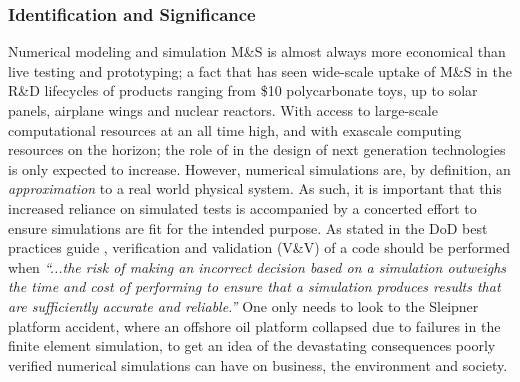 \subsubsection{Identification and Significance}
\label{intro}
Numerical modeling and simulation M\&S is almost always more economical than live testing and prototyping; a fact that has seen wide-scale uptake of M\&S in the R\&D lifecycles of products ranging from \$10 polycarbonate toys, up to solar panels, airplane wings and nuclear reactors. With access to large-scale computational resources at an all time high, and with exascale computing resources on the horizon; the role of \MS in the design of next generation technologies is only expected to increase. However, numerical simulations are, by definition, an \emph{approximation} to a real world physical system. As such, it is important that this increased reliance on simulated tests is accompanied by a concerted effort to ensure simulations are fit for the intended purpose.  As stated in the DoD best practices guide \cite{dodvv}, verification and validation (V\&V) of a code should be performed when  \emph{``...the risk of making an incorrect decision based on a simulation outweighs the time and cost of performing \VV to ensure that a simulation produces results that are sufficiently accurate and reliable.''} One only needs to look to the Sleipner platform accident, where an offshore oil platform collapsed due to failures in the finite element simulation, to get an idea of the devastating consequences poorly verified numerical simulations can have on business, the environment and society.


